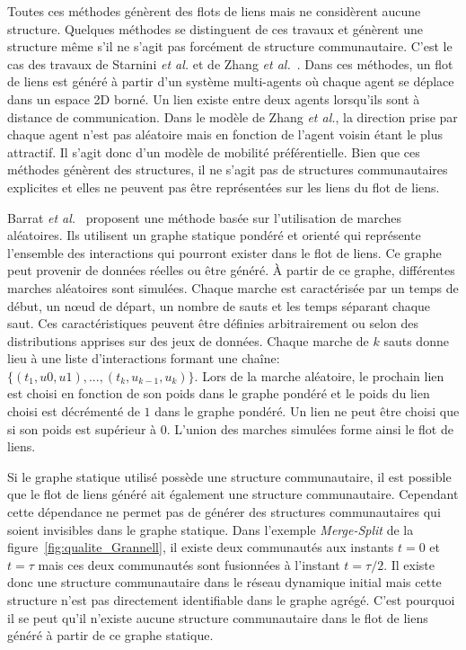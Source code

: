 Toutes ces méthodes génèrent des flots de liens mais ne considèrent aucune structure.
Quelques méthodes se distinguent de ces travaux et génèrent une structure même s'il ne s'agit pas forcément de structure communautaire.
C'est le cas des travaux de Starnini \emph{et al.}\cite{Starnini2013} et de Zhang \emph{et al.}~\cite{Zhang2015a}.
Dans ces méthodes, un flot de liens est généré à partir d'un système multi-agents où chaque agent se déplace dans un espace 2D borné.
Un lien existe entre deux agents lorsqu'ils sont à distance de communication.
Dans le modèle de Zhang \emph{et al.}, la direction prise par chaque agent n'est pas aléatoire mais en fonction de l'agent voisin étant le plus attractif.
Il s'agit donc d'un modèle de mobilité préférentielle.
Bien que ces méthodes génèrent des structures, il ne s'agit pas de structures communautaires explicites et elles ne peuvent pas être représentées sur les liens du flot de liens.



Barrat \emph{et al.}~\cite{Barrat2013a} proposent une méthode basée sur l'utilisation de marches aléatoires.
Ils utilisent un graphe statique pondéré et orienté qui représente l'ensemble des interactions qui pourront exister dans le flot de liens.
Ce graphe peut provenir de données réelles ou être généré.
\`A partir de ce graphe, différentes marches aléatoires sont simulées.
Chaque marche est caractérisée par un temps de début, un n\oe{}ud de départ, un nombre de sauts et les temps séparant chaque saut.
Ces caractéristiques peuvent être définies arbitrairement ou selon des distributions apprises sur des jeux de données.
Chaque marche de $k$ sauts donne lieu à une liste d'interactions formant une chaîne: $\{(t_1,u0,u1), ..., (t_k,u_{k-1}, u_k)\}$.
Lors de la marche aléatoire, le prochain lien est choisi en fonction de son poids dans le graphe pondéré et le poids du lien choisi est décrémenté de $1$ dans le graphe pondéré.
Un lien ne peut être choisi que si son poids est supérieur à $0$.
L'union des marches simulées forme ainsi le flot de liens.


Si le graphe statique utilisé possède une structure communautaire, il est possible que le flot de liens généré ait également une structure communautaire.
Cependant cette dépendance ne permet pas de générer des structures communautaires qui soient invisibles dans le graphe statique.
Dans l'exemple \emph{Merge-Split} de la figure~\ref{fig:qualite_Grannell}, il existe deux communautés aux instants $t=0$ et $t=\tau$ mais ces deux communautés sont fusionnées à l'instant $t=\tau/2$.
Il existe donc une structure communautaire dans le réseau dynamique initial mais cette structure n'est pas directement identifiable dans le graphe agrégé.
C'est pourquoi il se peut qu'il n'existe aucune structure communautaire dans le flot de liens généré à partir de ce graphe statique.


